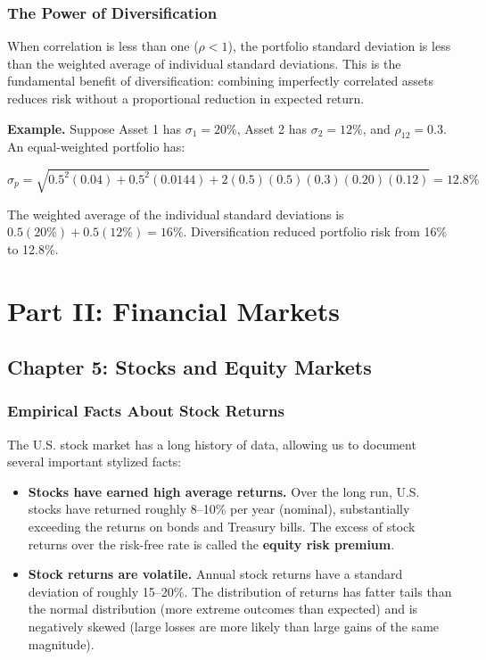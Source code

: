 \documentclass[11pt,letterpaper]{report}
\begin{document}
\section{The Power of Diversification}


When correlation is less than one ($\rho < 1$), the portfolio standard deviation is less than the weighted average of individual standard deviations.  This is the fundamental benefit of diversification: combining imperfectly correlated assets reduces risk without a proportional reduction in expected return.

\textbf{Example.}  Suppose Asset 1 has $\sigma_1 = 20\%$, Asset 2 has $\sigma_2 = 12\%$, and $\rho_{12} = 0.3$.  An equal-weighted portfolio has:

$$\sigma_p = \sqrt{0.5^2(0.04) + 0.5^2(0.0144) + 2(0.5)(0.5)(0.3)(0.20)(0.12)} = 12.8\%$$

The weighted average of the individual standard deviations is $0.5(20\%) + 0.5(12\%) = 16\%$.  Diversification reduced portfolio risk from 16\% to 12.8\%.


\part{Part II: Financial Markets}



\chapter{Chapter 5: Stocks and Equity Markets}


\section{Empirical Facts About Stock Returns}


The U.S. stock market has a long history of data, allowing us to document several important stylized facts:

\begin{itemize}
  \item \textbf{Stocks have earned high average returns.}  Over the long run, U.S. stocks have returned roughly 8--10\% per year (nominal), substantially exceeding the returns on bonds and Treasury bills.  The excess of stock returns over the risk-free rate is called the \textbf{equity risk premium}.
\end{itemize}

\begin{itemize}
  \item \textbf{Stock returns are volatile.}  Annual stock returns have a standard deviation of roughly 15--20\%.  The distribution of returns has fatter tails than the normal distribution (more extreme outcomes than expected) and is negatively skewed (large losses are more likely than large gains of the same magnitude).
\end{itemize}
\end{document}
